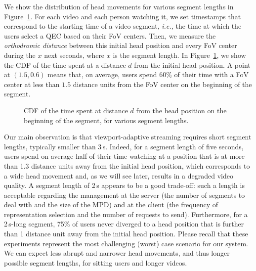 We show the distribution of head movements for various segment lengths
in Figure~\ref{cdf-dataset}. For each video and each person watching
it, we set timestamps that correspond to the starting time of a video
segment, \textit{i.e.,} the time at which the users select a QEC based
on their FoV centers. Then, we measure the \emph{orthodromic distance}
between this initial head position and every FoV center during the $x$
next seconds, where $x$ is the segment length. In
Figure~\ref{cdf-dataset}, we show the \ac{CDF} of the time spent at a
distance $d$ from the initial head position. A point at $(1.5,0.6)$
means that, on average, users spend $60\%$ of their time with a FoV
center at less than $1.5$ distance units from the FoV center on the
beginning of the segment.

\begin{figure}[htbp]
\centering

\caption{CDF of the time spent at distance $d$ from the head position on the beginning of the
segment, for various segment lengths.}\label{cdf-dataset}
\end{figure}

Our main observation is that viewport-adaptive streaming requires
short segment lengths, typically smaller than 3\,s. Indeed, for a
segment length of five seconds, users spend on average half of their
time watching at a position that is at more than 1.3 distance units
away from the initial head position, which corresponds to a wide head
movement and, as we will see later, results in a degraded video
quality. A segment length of 2\,s appears to be a good trade-off: such
a length is acceptable regarding the management at the server (the
number of segments to deal with and the size of the \ac{MPD}) and at
the client (the frequency of representation selection and the number
of requests to send). Furthermore, for a 2\,s-long segment, 75\% of
users never diverged to a head position that is further than 1
distance unit away from the initial head position. Please recall that
these experiments represent the most challenging (worst) case scenario
for our system. We can expect less abrupt and narrower head movements,
and thus longer possible segment lengths, for sitting users and longer
videos.
